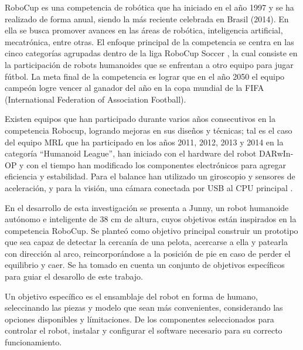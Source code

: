 RoboCup \cite{robotcup} es una competencia de robótica que ha iniciado en el año 1997 y se ha realizado de forma anual, siendo la más reciente celebrada en Brasil (2014). En ella se busca promover avances en las áreas de robótica, inteligencia artificial, mecatrónica, entre otras. El enfoque principal de la competencia se centra en las cinco categorías agrupadas dentro de la liga RoboCup Soccer \cite{robotcupsoccer}, la cual consiste en la participación de robots humanoides que se enfrentan a otro equipo para jugar fútbol. La meta final de la competencia es lograr que en el año 2050 el equipo campeón logre vencer al ganador del año en la copa mundial de la FIFA (International Federation of Association Football).

Existen equipos que han participado durante varios años consecutivos en la competencia Robocup, logrando mejoras en sus diseños y técnicas; tal es el caso del equipo MRL que ha participado en los años 2011, 2012, 2013 y 2014 en la categoría “Humanoid League”, han iniciado con el hardware del robot DARwIn-OP y con el tiempo han modificado los componentes electrónicos para agregar eficiencia y estabilidad. Para el balance han utilizado un giroscopio y sensores de aceleración, y para la visión, una cámara conectada por USB al CPU principal \cite{paper1}.

 

En el desarrollo de esta investigaci\'on se presenta a Junny, un robot humanoide aut\'onomo e inteligente de 38 cm de altura, cuyos objetivos están inspirados en la competencia RoboCup. Se planteó como objetivo principal construir un prototipo que sea capaz de detectar la cercanía de una pelota, acercarse a ella y patearla con direcci\'on al arco, reincorpor\'andose a la posici\'on de pie en caso de perder el equilibrio y caer. Se ha tomado en cuenta un conjunto de objetivos específicos para guiar el desarollo de este trabajo. %

Un objetivo espec\'ifico es el ensamblaje del robot en forma de humano, seleccinando las piezas y modelo que sean más convenientes, considerando las opciones disponibles y límitaciones. De los componentes seleccionados para controlar el robot, instalar y configurar el software necesario para su correcto funcionamiento.

